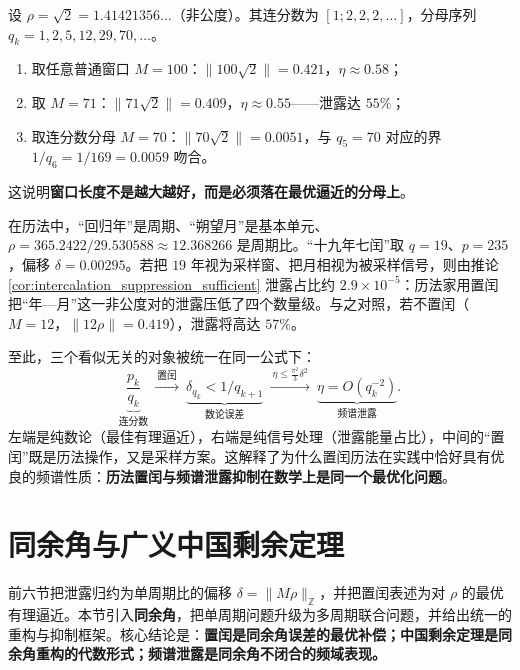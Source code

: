 \begin{example}[置闰窗与普通窗的对比]\label{ex:intercalation_vs_normal_window}
设 $\rho=\sqrt2=1.41421356\ldots$（非公度）。其连分数为 $[1;2,2,2,\dots]$，分母序列 $q_k=1,2,5,12,29,70,\dots$。
\begin{enumerate}[label=(\roman*)]
    \item 取任意普通窗口 $M=100$：$\|100\sqrt2\|=0.421$，$\eta\approx0.58$；
    \item 取 $M=71$：$\|71\sqrt2\|=0.409$，$\eta\approx0.55$——泄露达 $55\%$；
    \item 取连分数分母 $M=70$：$\|70\sqrt2\|=0.0051$，与 $q_5=70$ 对应的界 $1/q_6=1/169=0.0059$ 吻合。
\end{enumerate}
这说明\textbf{窗口长度不是越大越好，而是必须落在最优逼近的分母上}。
\end{example}

\begin{example}[历法置闰即置闰窗口]\label{ex:calendar_intercalation_parallel}
在历法中，“回归年”是周期、“朔望月”是基本单元、$\rho=365.2422/29.530588\approx12.368266$ 是周期比。“十九年七闰”取 $q=19$、$p=235$，偏移 $\delta=0.00295$。若把 $19$ 年视为采样窗、把月相视为被采样信号，则由推论 \ref{cor:intercalation_suppression_sufficient} 泄露占比约 $2.9\times10^{-5}$：历法家用置闰把“年—月”这一非公度对的泄露压低了四个数量级。与之对照，若不置闰（$M=12$，$\|12\rho\|=0.419$），泄露将高达 $57\%$。
\end{example}

\begin{remark}[统一视角]\label{rem:leakage_intercalation_unified}
至此，三个看似无关的对象被统一在同一公式下：
\[
\underbrace{\frac{p_k}{q_k}}_{\text{连分数}}\ \xrightarrow{\ \text{置闰}\ }\ \underbrace{\delta_{q_k}<1/q_{k+1}}_{\text{数论误差}}\ \xrightarrow{\ \eta\le\frac{\pi^2}{3}\delta^2\ }\ \underbrace{\eta=O(q_k^{-2})}_{\text{频谱泄露}} .
\]
左端是纯数论（最佳有理逼近），右端是纯信号处理（泄露能量占比），中间的“置闰”既是历法操作，又是采样方案。这解释了为什么置闰历法在实践中恰好具有优良的频谱性质：\textbf{历法置闰与频谱泄露抑制在数学上是同一个最优化问题}。
\end{remark}

\section{同余角与广义中国剩余定理}\label{sec:congruence_angle_crt}

前六节把泄露归约为单周期比的偏移 $\delta=\|M\rho\|_{\mathbb{Z}}$，并把置闰表述为对 $\rho$ 的最优有理逼近。本节引入\textbf{同余角}，把单周期问题升级为多周期联合问题，并给出统一的重构与抑制框架。核心结论是：\textbf{置闰是同余角误差的最优补偿；中国剩余定理是同余角重构的代数形式；频谱泄露是同余角不闭合的频域表现。}

